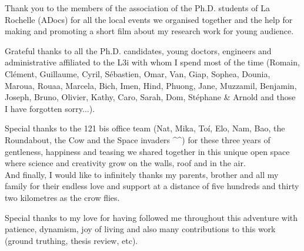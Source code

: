 Thank you to the members of the association of the Ph.D. students of La Rochelle (ADocs) for all the local events we organised together and the help for making and promoting a short film about my research work for young audience.

Grateful thanks to all the Ph.D. candidates, young doctors, engineers and administrative affiliated to the L3i with whom I spend most of the time (Romain, Clément, Guillaume, Cyril, Sébastien, Omar, Van, Giap, Sophea, Dounia, Maroua, Rouaa, Marcela, Bich, Imen, Hind, Phuong, Jane, Muzzamil, Benjamin, Joseph, Bruno, Olivier, Kathy, Caro, Sarah, Dom, Stéphane \& Arnold and those I have forgotten sorry...).

Special thanks to the 121 bis office team (Nat, Mika, To\'{i}, Elo, Nam, Bao, the Roundabout, the Cow and the Space invaders \^{ }\^{ }) for these three years of gentleness, happiness and teasing we shared together in this unique open space where science and creativity grow on the walls, roof and in the air.
\\

And finally, I would like to infinitely thanks my parents, brother and all my family for their endless love and support at a distance of five hundreds and thirty two kilometres as the crow flies.

Special thanks to my love for having followed me throughout this adventure with patience, dynamism, joy of living and also many contributions to this work (ground truthing, thesis review, etc).





